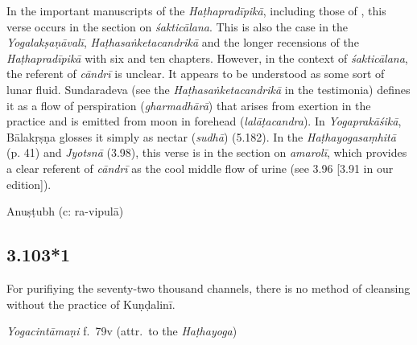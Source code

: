 \begin{ekdosis}
\begin{philcomm}[hp03_103]
In the important manuscripts of the \emph{Haṭhapradīpikā}, including those of \textalpha, this verse occurs in the section on \emph{śakticālana}. This is also the case in the \emph{Yogalakṣaṇāvalī}, \emph{Haṭhasaṅketacandrikā} and the longer recensions of the \emph{Haṭhapradīpikā} with six and ten chapters. However, in the context of \emph{śakticālana}, the referent of \emph{cāndrī} is unclear. It appears to be understood as some sort of lunar fluid. Sundaradeva (see the \emph{Haṭhasaṅketacandrikā} in the testimonia) defines it as a flow of perspiration (\emph{gharmadhārā}) that arises from exertion in the practice and is emitted from moon in forehead (\emph{lalāṭacandra}). In \emph{Yogaprakāśikā}, Bālakṛṣṇa glosses it simply as nectar (\emph{sudhā}) (5.182). In the \emph{Haṭhayogasaṃhitā} (p. 41) and \emph{Jyotsnā} (3.98), this verse is in the section on \emph{amarolī}, which provides a clear referent of \emph{cāndrī} as the cool middle flow of urine (see 3.96 [3.91 in our edition]).  

\end{philcomm}

\begin{metre}[hp03_103]
Anuṣṭubh (c: ra-vipulā)
\end{metre}

\subsection*{3.103*1}
\begin{translation}[hp03_103_1]
For purifiying the seventy-two thousand channels, there is no method of cleansing without the practice of Kuṇḍalinī.
\end{translation}

\begin{testimonia}[hp03_103_1]
\emph{Yogacintāmaṇi} f.~79v (attr.~to the \emph{Haṭhayoga})
\begin{versinnote}
\end{versinnote}


\end{testimonia}
\end{ekdosis}
